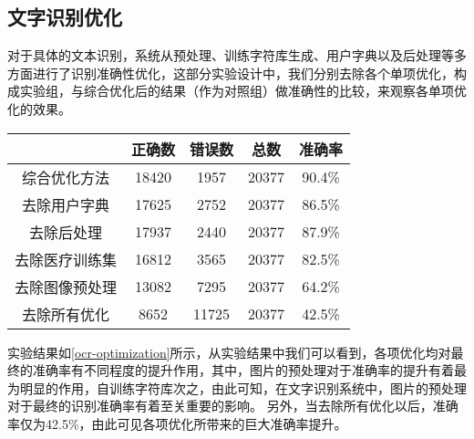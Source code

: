 \subsection{文字识别优化}
对于具体的文本识别，系统从预处理、训练字符库生成、用户字典以及后处理等多方面进行了识别准确性优化，这部分实验设计中，我们分别去除各个单项优化，构成实验组，与综合优化后的结果（作为对照组）做准确性的比较，来观察各单项优化的效果。
\begin{table}[!htbp]
	\label{ocr-optimization}
	\centering
	\vspace{10pt}
  \renewcommand\arraystretch{1.5}  %
	\begin{tabular}{c||c|c|c|c}
    \hline
    & 正确数 & 错误数 & 总数 & 准确率 \\
		\hline
    综合优化方法 & 18420 & 1957 & 20377 & 90.4\% \\
		\hline
    去除用户字典 & 17625 & 2752 & 20377 & 86.5\% \\
		\hline
    去除后处理 & 17937 & 2440 & 20377 & 87.9\% \\
		\hline
    去除医疗训练集 & 16812 & 3565 & 20377 & 82.5\% \\
		\hline
    去除图像预处理 & 13082 & 7295 & 20377 & 64.2\% \\
		\hline
    去除所有优化 & 8652 & 11725 & 20377 & 42.5\% \\
    \hline
	\end{tabular}
\end{table}
实验结果如\autoref{ocr-optimization}所示，从实验结果中我们可以看到，各项优化均对最终的准确率有不同程度的提升作用，其中，图片的预处理对于准确率的提升有着最为明显的作用，自训练字符库次之，由此可知，在文字识别系统中，图片的预处理对于最终的识别准确率有着至关重要的影响。
另外，当去除所有优化以后，准确率仅为42.5\%，由此可见各项优化所带来的巨大准确率提升。

